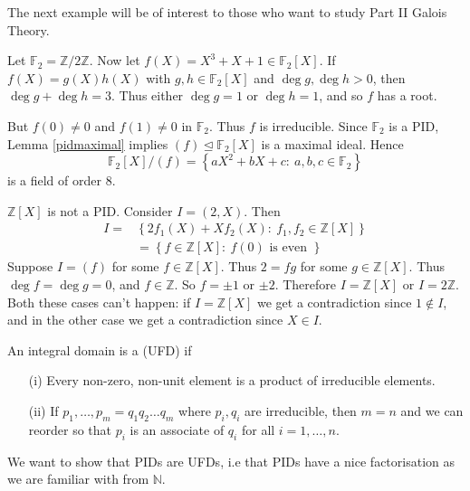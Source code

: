 \documentclass[egregdoesnotlikesansseriftitles,a4paper]{scrartcl}
\begin{document}
The next example will be of interest to those who want to study Part II Galois Theory.
\begin{example*}
       Let $\mathbb{F}_2 =\mathbb{Z}/2\mathbb{Z}$. Now let $f (X)=X^3 +X+1 \in \mathbb{F}_{2}[X]$. If $f (X)=g (X)h (X)$ with $g, h \in \mathbb{F}_{2}[X]$ and $\operatorname{deg}g , \operatorname{deg}h >0$, then $\operatorname{deg}g+ \operatorname{deg}h=3$. Thus either $\operatorname{deg}g =1$ or $\operatorname{deg}h=1$, and so $f$ has a root. 

       But $f (0 )\neq 0$ and $f (1)\neq 0$ in $\mathbb{F}_{2}$. Thus $f$ is irreducible. Since $\mathbb{F}_{2}$ is a PID, Lemma \ref{pidmaximal} implies $(f) \unlhd \mathbb{F}_{2}[X]$ is a maximal ideal. Hence \[
            \mathbb{F}_{2}[X]/(f)=\left\{aX^2+bX+c: \ a,b,c \in \mathbb{F}_{2}\right\}
       \] is a field of order 8.
\end{example*}
\begin{example*}
       $\mathbb{Z}[X]$ is not a PID. Consider $I = (2,X)$. Then
       \begin{align*}
            I=&\left\{2f_1 (X)+X f_2 (X): \ f_1 ,f_2 \in \mathbb{Z}[X]\right\}\\
            &=\left\{f \in \mathbb{Z}[X]: \ f (0)\text{ is even } \right\}
       \end{align*}
       Suppose $I= (f)$ for some $f \in \mathbb{Z}[X]$. Thus $2=fg$ for some $g \in \mathbb{Z}[X]$. Thus $\operatorname{deg}f=\operatorname{deg}g =0$, and $f \in \mathbb{Z}$. So $f= \pm 1 $ or $\pm 2$. Therefore $I=\mathbb{Z}[X]$ or $I=2\mathbb{Z}$. Both these cases can't happen: if $I=\mathbb{Z}[X]$ we get a contradiction since $1 \notin I$, and in the other case we get a contradiction since $X \in I$.
\end{example*}
\begin{definition*}
       An integral domain is a  (UFD) if 
       \begin{itemize}
             \item[(i)] Every non-zero, non-unit element is a product of irreducible elements.
             \item[(ii)] If $p_1 ,\ldots, p_m =q_1 q_2 \ldots q_{m}$ where $p_{i}, q_i$ are irreducible, then $m=n$ and we can reorder so that $p_i$ is an associate of $q_{i}$ for all $i=1,\ldots,n$. 
       \end{itemize}
\end{definition*}
\begin{goal}
      We want to show that PIDs are UFDs, i.e that PIDs have a nice factorisation as we are familiar with from $\mathbb{N}$.
\end{goal}
\end{document}
